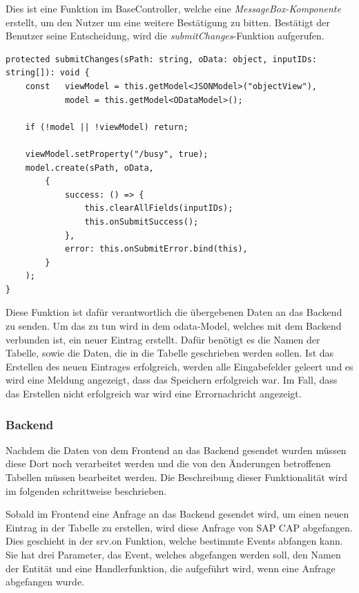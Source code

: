Dies ist eine Funktion im BaseController, welche eine \textit{MessageBox-Komponente} erstellt, um den Nutzer um eine weitere Bestätigung zu bitten.
Bestätigt der Benutzer seine Entscheidung, wird die \textit{submitChanges}-Funktion aufgerufen.

\begin{lstlisting}[caption={submitChanges Funktion}]
protected submitChanges(sPath: string, oData: object, inputIDs: string[]): void {
    const   viewModel = this.getModel<JSONModel>("objectView"),
            model = this.getModel<ODataModel>();

    if (!model || !viewModel) return;

    viewModel.setProperty("/busy", true);
    model.create(sPath, oData,
        {
            success: () => {
                this.clearAllFields(inputIDs);
                this.onSubmitSuccess();
            },
            error: this.onSubmitError.bind(this),
        }
    );
} 
\end{lstlisting}

Diese Funktion ist dafür verantwortlich die übergebenen Daten an das Backend zu senden.
Um das zu tun wird in dem \gls{odata}-Model, welches mit dem Backend verbunden ist, ein neuer Eintrag erstellt.
Dafür benötigt es die Namen der Tabelle, sowie die Daten, die in die Tabelle geschrieben werden sollen.
Ist das Erstellen des neuen Eintrages erfolgreich, werden alle Eingabefelder geleert und es wird eine Meldung angezeigt, dass das Speichern erfolgreich war.
Im Fall, dass das Erstellen nicht erfolgreich war wird eine Errornachricht angezeigt.

\subsubsection[Backend]{Backend}

Nachdem die Daten von dem Frontend an das Backend gesendet wurden müssen diese Dort noch verarbeitet werden und die von den Änderungen betroffenen Tabellen müssen bearbeitet werden.
Die Beschreibung dieser Funktionalität wird im folgenden schrittweise beschrieben.

Sobald im Frontend eine Anfrage an das Backend gesendet wird, um einen neuen Eintrag in der Tabelle zu erstellen, wird diese Anfrage von SAP CAP abgefangen. Dies geschieht in der srv.on Funktion, welche bestimmte Events abfangen kann. Sie hat drei Parameter, das Event, welches abgefangen werden soll, den Namen der Entität und eine Handlerfunktion, die aufgeführt wird, wenn eine Anfrage abgefangen wurde.

